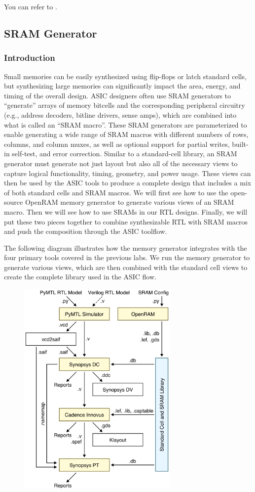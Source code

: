 \documentclass[a4paper,12pt,twoside]{article}
\begin{document}
You can refer to \cite{bppdf}.
\subsection{SRAM Generator}
\subsubsection{Introduction}
Small memories can be easily synthesized using flip-flops or latch standard cells, but synthesizing large memories can significantly impact the area, energy, and timing of the overall design. ASIC designers often use SRAM generators to “generate” arrays of memory bitcells and the corresponding peripheral circuitry (e.g., address decoders, bitline drivers, sense amps), which are combined into what is called an “SRAM macro”. These SRAM generators are parameterized to enable generating a wide range of SRAM macros with different numbers of rows, columns, and column muxes, as well as optional support for partial writes, built-in self-test, and error correction. Similar to a standard-cell library, an SRAM generator must generate not just layout but also all of the necessary views to capture logical functionality, timing, geometry, and power usage. These views can then be used by the ASIC tools to produce a complete design that includes a mix of both standard cells and SRAM macros. We will first see how to use the open-source OpenRAM memory generator to generate various views of an SRAM macro. Then we will see how to use SRAMs in our RTL designs. Finally, we will put these two pieces together to combine synthesizable RTL with SRAM macros and push the composition through the ASIC toolflow.

The following diagram illustrates how the memory generator integrates with the four primary tools covered in the previous labs. We run the memory generator to generate various views, which are then combined with the standard cell views to create the complete library used in the ASIC flow.
\begin{figure}[H]
    \centering
    \includegraphics[width=0.7\textwidth]{images/12.png}
\end{figure}
\end{document}
